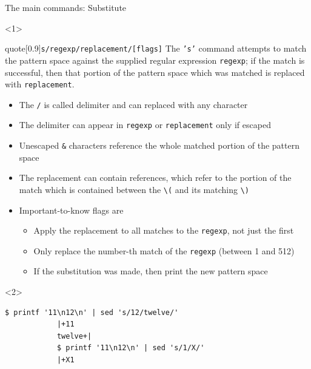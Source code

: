\begin{frame}[fragile]{The main commands: Substitute}
    \vspace{-1mm}
    \begin{onlyenv}<1>
        \begin{varblock}{quote}[0.9\textwidth]{\texttt{s/regexp/replacement/[flags]}}
            \textnormal{The \texttt{'s'} command attempts to match the pattern space against the supplied regular expression \texttt{regexp};
            if the match is successful, then that portion of the pattern space which was matched is replaced with \texttt{replacement}.}
        \end{varblock}
        \begin{itemize}
            \item The \texttt{/} is called delimiter and can replaced with any character
            \item The delimiter can appear in \texttt{regexp} or \texttt{replacement} only if escaped
            \item Unescaped \alert{\texttt{\&}} characters reference \alert{the whole matched portion of the pattern space}
            \item The replacement can contain  references,
                  which refer to the portion of the match which is contained between the  \texttt{\textbackslash(} and its matching \texttt{\textbackslash)}
            \item Important-to-know flags are
                  \begin{itemize}
                      \item[g] Apply the replacement to all matches to the \texttt{regexp}, not just the first
                      \item[number] Only replace the number-th match of the \texttt{regexp} (between 1 and 512)
                      \item[p] If the substitution was made, then print the new pattern space
                  \end{itemize}
        \end{itemize}
    \end{onlyenv}
    \begin{onlyenv}<2>
        \begin{lstlisting}[style=MyBash]
            $ printf '11\n12\n' | sed 's/12/twelve/'
            |+11
            twelve+|
            $ printf '11\n12\n' | sed 's/1/X/'
            |+X1

\end{lstlisting}
\end{onlyenv}
\end{frame}

